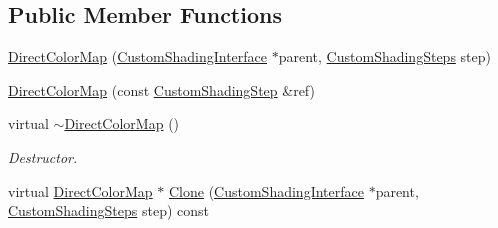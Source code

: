 \subsection*{Public Member Functions}
\begin{DoxyCompactItemize}
\item 
\mbox{\hyperlink{class_geometry_engine_1_1_custom_shading_1_1_direct_color_map_ac5a0725e933fe4d5b75a46b7fa83e0dc}{Direct\+Color\+Map}} (\mbox{\hyperlink{class_geometry_engine_1_1_custom_shading_1_1_custom_shading_interface}{Custom\+Shading\+Interface}} $\ast$parent, \mbox{\hyperlink{namespace_geometry_engine_1_1_custom_shading_a2dc236a5b567da5099069ce2b2be5609}{Custom\+Shading\+Steps}} step)
\item 
\mbox{\hyperlink{class_geometry_engine_1_1_custom_shading_1_1_direct_color_map_a3d5033ee5a9ab64ebed320a28735cac7}{Direct\+Color\+Map}} (const \mbox{\hyperlink{class_geometry_engine_1_1_custom_shading_1_1_custom_shading_step}{Custom\+Shading\+Step}} \&ref)
\item 
\mbox{\label{class_geometry_engine_1_1_custom_shading_1_1_direct_color_map_a816cf4cc4e64cbde7f52cf9578a01292}} 
virtual \mbox{\hyperlink{class_geometry_engine_1_1_custom_shading_1_1_direct_color_map_a816cf4cc4e64cbde7f52cf9578a01292}{$\sim$\+Direct\+Color\+Map}} ()
\begin{DoxyCompactList}\small\item\em Destructor. \end{DoxyCompactList}\item 
virtual \mbox{\hyperlink{class_geometry_engine_1_1_custom_shading_1_1_direct_color_map}{Direct\+Color\+Map}} $\ast$ \mbox{\hyperlink{class_geometry_engine_1_1_custom_shading_1_1_direct_color_map_aef31a0e4c639e006292dde48e9d2c710}{Clone}} (\mbox{\hyperlink{class_geometry_engine_1_1_custom_shading_1_1_custom_shading_interface}{Custom\+Shading\+Interface}} $\ast$parent, \mbox{\hyperlink{namespace_geometry_engine_1_1_custom_shading_a2dc236a5b567da5099069ce2b2be5609}{Custom\+Shading\+Steps}} step) const
\end{DoxyCompactItemize}
